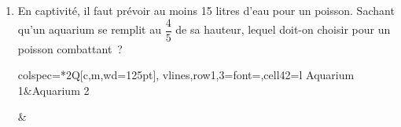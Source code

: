 \documentclass[exercice]{thedocument}%
\begin{document}
    \begin{enumerate}
        \item En captivité, il faut prévoir au moins 15 litres d'eau pour un
        poisson. Sachant qu'un aquarium se remplit au $\dfrac45$ de sa hauteur,
        lequel doit-on choisir pour un poisson combattant~?\par\smallskip\noindent
    \begin{minipage}{.5\linewidth}
        \begin{tblr}{%
                colspec=*{2}{Q[c,m,wd=125pt]},
                vlines,row{1,3}={font=\bfseries},cell{4}{2}={l}
                }
            \hline
            Aquarium 1&Aquarium 2\\
            &
\end{tblr}
\end{minipage}
\end{enumerate}
\end{document}
